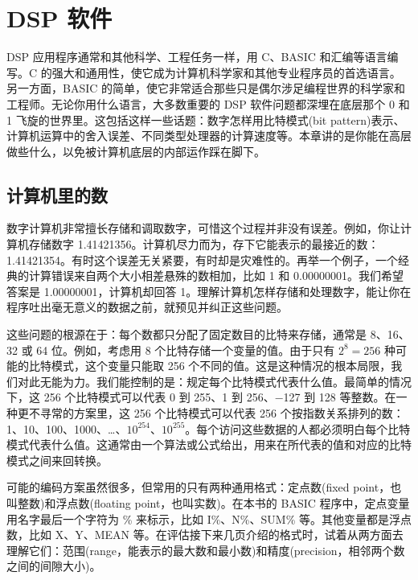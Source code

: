 
\chapter{DSP 软件}\label{ch-04}

DSP 应用程序通常和其他科学、工程任务一样，用 C、BASIC
和汇编等语言编写。C
的强大和通用性，使它成为计算机科学家和其他专业程序员的首选语言。另一方面，BASIC
的简单，使它非常适合那些只是偶尔涉足编程世界的科学家和工程师。无论你用什么语言，大多数重要的
DSP 软件问题都深埋在底层那个 0 和 1
飞旋的世界里。这包括这样一些话题：数字怎样用比特模式(bit
pattern)表示、计算机运算中的舍入误差、不同类型处理器的计算速度等。本章讲的是你能在高层做些什么，以免被计算机底层的内部运作踩在脚下。

\section{计算机里的数}

数字计算机非常擅长存储和调取数字，可惜这个过程并非没有误差。例如，你让计算机存储数字
1.41421356。计算机尽力而为，存下它能表示的最接近的数：1.41421354。有时这个误差无关紧要，有时却是灾难性的。再举一个例子，一个经典的计算错误来自两个大小相差悬殊的数相加，比如
1 和 0.00000001。我们希望答案是 1.00000001，计算机却回答
1。理解计算机怎样存储和处理数字，能让你在程序吐出毫无意义的数据之前，就预见并纠正这些问题。

这些问题的根源在于：每个数都只分配了固定数目的比特来存储，通常是
8、16、32 或 64 位。例如，考虑用 8 个比特存储一个变量的值。由于只有
\(2^8 = 256\) 种可能的比特模式，这个变量只能取 256
个不同的值。这是这种情况的根本局限，我们对此无能为力。我们能控制的是：规定每个比特模式代表什么值。最简单的情况下，这
256 个比特模式可以代表 0 到 255、1 到 256、−127 到 128
等整数。在一种更不寻常的方案里，这 256 个比特模式可以代表 256
个按指数关系排列的数：1、10、100、1000、\ldots、\(10^{254}\)、\(10^{255}\)。每个访问这些数据的人都必须明白每个比特模式代表什么值。这通常由一个算法或公式给出，用来在所代表的值和对应的比特模式之间来回转换。

可能的编码方案虽然很多，但常用的只有两种通用格式：定点数(fixed
point，也叫整数)和浮点数(floating point，也叫实数)。在本书的 BASIC
程序中，定点变量用名字最后一个字符为 \% 来标示，比如 I\%、N\%、SUM\%
等。其他变量都是浮点数，比如 X、Y、MEAN
等。在评估接下来几页介绍的格式时，试着从两方面去理解它们：范围(range，能表示的最大数和最小数)和精度(precision，相邻两个数之间的间隙大小)。

